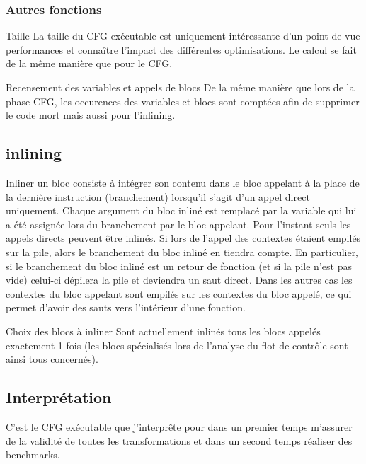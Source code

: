 \documentclass{beamer}
\begin{document}
\subsubsection{Autres fonctions}

\begin{frame}{Taille}
    La taille du CFG exécutable est uniquement intéressante d'un point de vue performances et connaître l'impact des différentes optimisations. Le calcul se fait de la même manière que pour le CFG.
\end{frame}

\begin{frame}{Recensement des variables et appels de blocs}
    De la même manière que lors de la phase CFG, les occurences des variables et blocs sont comptées afin de supprimer le code mort mais aussi pour l'inlining.
\end{frame}

\subsection{inlining}

Inliner un bloc consiste à intégrer son contenu dans le bloc appelant à la place de la dernière instruction (branchement) lorsqu'il s'agit d'un appel direct uniquement. Chaque argument du bloc inliné est remplacé par la variable qui lui a été assignée lors du branchement par le bloc appelant. Pour l'instant seuls les appels directs peuvent être inlinés. Si lors de l'appel des contextes étaient empilés sur la pile, alors le branchement du bloc inliné en tiendra compte. En particulier, si le branchement du bloc inliné est un retour de fonction (et si la pile n'est pas vide) celui-ci dépilera la pile et deviendra un saut direct. Dans les autres cas les contextes du bloc appelant sont empilés sur les contextes du bloc appelé, ce qui permet d'avoir des sauts vers l'intérieur d'une fonction.

\begin{frame}{Choix des blocs à inliner}
    Sont actuellement inlinés tous les blocs appelés exactement 1 fois (les blocs spécialisés lors de l'analyse du flot de contrôle sont ainsi tous concernés).
\end{frame}

\subsection{Interprétation}

C'est le CFG exécutable que j'interprête pour dans un premier temps m'assurer de la validité de toutes les transformations et dans un second temps réaliser des benchmarks.
\end{document}
